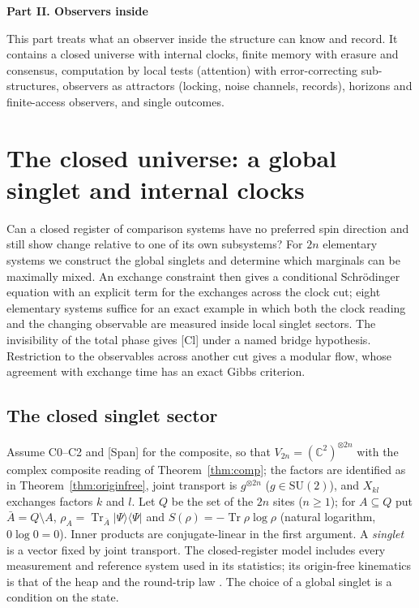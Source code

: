 \documentclass[aps,pra,onecolumn,superscriptaddress,nofootinbib,10pt]{revtex4-2}
\theoremstyle{definition}
\theoremstyle{remark}
\newcommand{\C}{\mathbb{C}}
\newcommand{\tr}{\operatorname{Tr}}
\newcommand{\SU}{\mathrm{SU}}
\newcommand{\paperpart}[1]{\par\bigskip\begin{center}\large\bfseries #1\end{center}\par\medskip}
\begin{document}
\paperpart{Part II.  Observers inside}
\noindent This part treats what an observer inside the structure can know and record.  It contains a
closed universe with internal clocks, finite memory with erasure and consensus, computation by local
tests (attention) with error-correcting sub-structures, observers as attractors (locking, noise channels,
records), horizons and finite-access observers, and single outcomes.

\section{The closed universe: a global singlet and internal clocks}\label{sec:closedreg}
Can a closed register of comparison systems have no preferred spin direction and still show change
relative to one of its own subsystems?  For $2n$ elementary systems we construct the global singlets and
determine which marginals can be maximally mixed.  An exchange constraint then gives a conditional
Schr\"odinger equation with an explicit term for the exchanges across the clock cut; eight elementary
systems suffice for an exact example in which both the clock reading and the changing observable are
measured inside local singlet sectors.  The invisibility of the total phase gives [Cl] under a named
bridge hypothesis.  Restriction to the observables across another cut gives a modular flow, whose
agreement with exchange time has an exact Gibbs criterion.

\subsection{The closed singlet sector}\label{sec:cusinglet}
Assume C0--C2 and [Span] for the composite, so that $V_{2n}=(\C^2)^{\otimes2n}$ with the complex composite reading of
Theorem~\ref{thm:comp}; the factors are identified as in Theorem~\ref{thm:originfree}, joint transport is $g^{\otimes2n}$
($g\in\SU(2)$), and $X_{kl}$ exchanges factors $k$ and $l$.  Let $Q$ be the set of the $2n$ sites ($n\ge1$); for $A\subseteq Q$
put $\bar A=Q\setminus A$, $\rho_A=\tr_{\bar A}\lvert\Psi\rangle\langle\Psi\rvert$ and $S(\rho)=-\tr\rho\log\rho$ (natural logarithm, $0\log0=0$).  Inner
products are conjugate-linear in the first argument.  A \emph{singlet} is a vector fixed by joint transport.
The closed-register model includes every measurement and reference system used in its statistics; its
origin-free kinematics is that of the heap and the round-trip law \cite[Def.~2.3, Thm.~3.1]{PaperI}.
The choice of a global singlet is a condition on the state.
\end{document}
